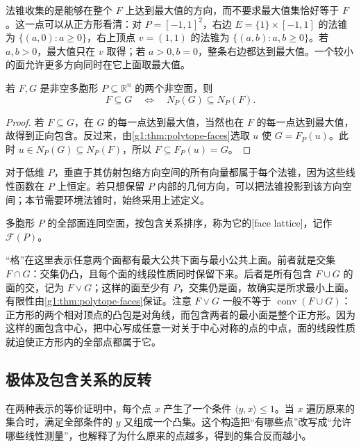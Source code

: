 法锥收集的是能够在整个 \(F\) 上达到最大值的方向，而不要求最大值集恰好等于 \(F\)。这一点可以从正方形看清：对 \(P=[-1,1]^2\)，右边 \(E=\{1\}\times[-1,1]\) 的法锥为 \(\{(a,0):a\ge0\}\)，右上顶点 \(v=(1,1)\) 的法锥为 \(\{(a,b):a,b\ge0\}\)。若 \(a,b>0\)，最大值只在 \(v\) 取得；若 \(a>0,b=0\)，整条右边都达到最大值。一个较小的面允许更多方向同时在它上面取最大值。

\begin{proposition}
	\label{g1:prop:normal-cone-order}
	若 \(F,G\) 是非空多胞形 \(P\subseteq\mathbb R^n\) 的两个非空面，则
	\[
		F\subseteq G\quad\Longleftrightarrow\quad N_P(G)\subseteq N_P(F).
	\]
\end{proposition}

\begin{proof}
	若 \(F\subseteq G\)，在 \(G\) 的每一点达到最大值，当然也在 \(F\) 的每一点达到最大值，故得到正向包含。反过来，由\cref{g1:thm:polytope-faces}选取 \(u\) 使 \(G=F_P(u)\)。此时 \(u\in N_P(G)\subseteq N_P(F)\)，所以 \(F\subseteq F_P(u)=G\)。
\end{proof}

对于低维 \(P\)，垂直于其仿射包络方向空间的所有向量都属于每个法锥，因为这些线性函数在 \(P\) 上恒定。若只想保留 \(P\) 内部的几何方向，可以把法锥投影到该方向空间；本节需要环境法锥时，始终采用上述定义。

\begin{definition}
	\label{g1:def:face-lattice}
	多胞形 \(P\) 的全部面连同空面，按包含关系排序，称为它的[face lattice]，记作 \(\mathcal F(P)\)。
\end{definition}

“格”在这里表示任意两个面都有最大公共下面与最小公共上面。前者就是交集 \(F\cap G\)：交集仍凸，且每个面的线段性质同时保留下来。后者是所有包含 \(F\cup G\) 的面的交，记为 \(F\vee G\)；这样的面至少有 \(P\)，交集仍是面，故确实是所求最小上面。有限性由\cref{g1:thm:polytope-faces}保证。注意 \(F\vee G\) 一般不等于 \(\operatorname{conv}(F\cup G)\)：正方形的两个相对顶点的凸包是对角线，而包含两者的最小面是整个正方形。因为这样的面包含中心，把中心写成任意一对关于中心对称的点的中点，面的线段性质就迫使正方形内的全部点都属于它。

\subsection{极体及包含关系的反转}
\label{g1:subsec:0303:04}

在两种表示的等价证明中，每个点 \(x\) 产生了一个条件 \(\langle y,x\rangle\le1\)。当 \(x\) 遍历原来的集合时，满足全部条件的 \(y\) 又组成一个凸集。这个构造把“有哪些点”改写成“允许哪些线性测量”，也解释了为什么原来的点越多，得到的集合反而越小。

